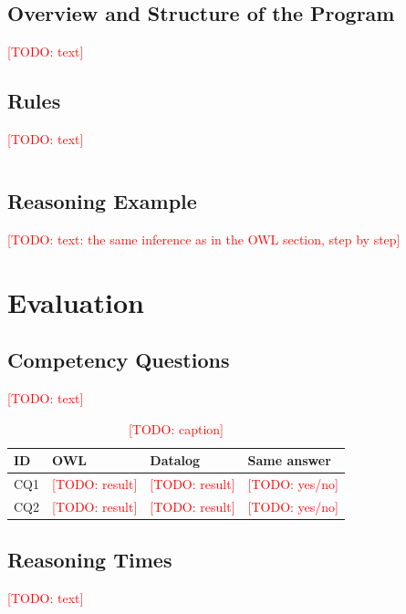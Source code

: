 \documentclass[runningheads]{llncs}
\newcommand{\todo}[1]{\textcolor{red}{[TODO: #1]}}
\begin{document}
\subsection{Overview and Structure of the Program}
\todo{text}

\subsection{Rules}
\todo{text}

\begin{lstlisting}[caption={\todo{caption}}, label={lst:rules}]
% paste the group's own rule(s) here
\end{lstlisting}

\subsection{Reasoning Example}
\todo{text: the same inference as in the OWL section, step by step}

\section{Evaluation}

\subsection{Competency Questions}
\todo{text}

\begin{table}[t]
\caption{\todo{caption}}
\label{tab:eval}
\centering
\begin{tabularx}{\textwidth}{@{}lXXl@{}}
\toprule
ID & OWL & Datalog & Same answer \\
\midrule
CQ1 & \todo{result} & \todo{result} & \todo{yes/no} \\
CQ2 & \todo{result} & \todo{result} & \todo{yes/no} \\
\bottomrule
\end{tabularx}
\end{table}

\subsection{Reasoning Times}
\todo{text}
\end{document}
